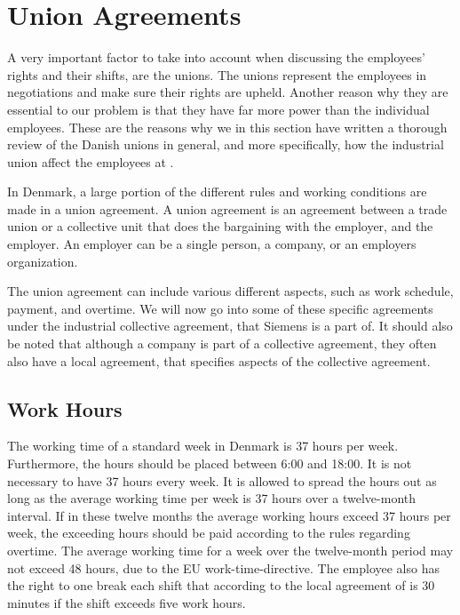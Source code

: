 \section{Union Agreements}

A very important factor to take into account when discussing the employees' rights and their shifts, are the unions. The unions represent the employees in negotiations and make sure their rights are upheld. Another reason why they are essential to our problem is that they have far more power than the individual employees. These are the reasons why we in this section have written a thorough review of the Danish unions in general, and more specifically, how the industrial union affect the employees at \siemens.

In Denmark, a large portion of the different rules and working conditions are made in a union agreement. A union agreement is an agreement between a trade union or a collective unit that does the bargaining with the employer, and the employer. An employer can be a single person, a company, or an employers organization.

The union agreement can include various different aspects, such as work schedule, payment, and overtime. We will now go into some of these specific agreements under the industrial collective agreement, that Siemens is a part of. It should also be noted that although a company is part of a collective agreement, they often also have a local agreement, that specifies aspects of the collective agreement. \parencite{noauthor_collective_nodate}

\subsection{Work Hours}
The working time of a standard week in Denmark is 37 hours per week. Furthermore, the hours should be placed between 6:00 and 18:00.
It is not necessary to have 37 hours every week. It is allowed to spread the hours out as long as the average working time per week is 37 hours over a twelve-month interval. 
If in these twelve months the average working hours exceed 37 hours per week, the exceeding hours should be paid according to the rules regarding overtime. The average working time for a week over the twelve-month period may not exceed 48 hours, due to the EU work-time-directive. The employee also has the right to one break each shift that according to the local agreement of \siemens is 30 minutes if the shift exceeds five work hours. \parencite{industriens_overenskomst}

